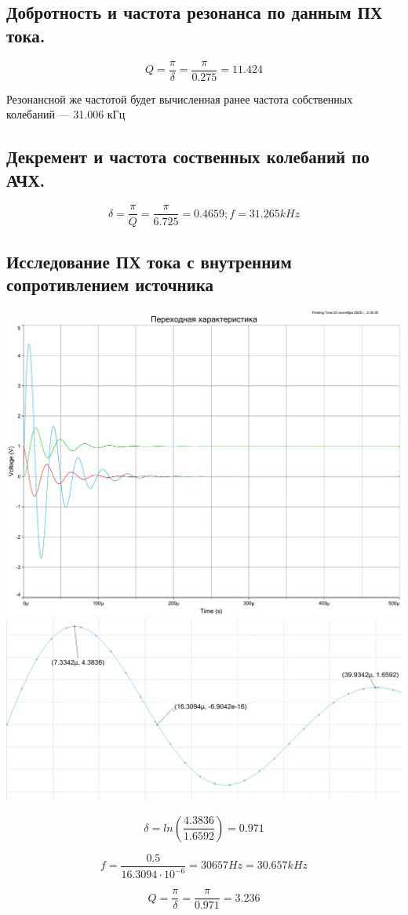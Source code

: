 \documentclass[12pt,a4paper]{article}
\begin{document}
		\subsection{Добротность и частота резонанса по данным ПХ тока.\newline}
			
			\[Q = \frac{\pi}{\delta} = \frac{\pi}{0.275} = 11.424\]
			
			Резонансной же частотой будет вычисленная ранее частота собственных колебаний --- 31.006 кГц
			
		\subsection{Декремент и частота соственных колебаний по АЧХ.\newline}
		
			\[\delta = \frac{\pi}{Q} = \frac{\pi}{6.725} = 0.4659; f = 31.265 kHz\]
			
		\subsection{Исследование ПХ тока с внутренним сопротивлением источника\newline}
		
			\includegraphics[width=0.5\linewidth]{src/TH_20om}
			\includegraphics[width=0.5\linewidth]{src/TH_current_20m}
			
			\[\delta = ln\left(\frac{4.3836}{1.6592}\right) = 0.971\]
			
			\[f = \frac{0.5}{16.3094 \cdot 10^{-6}} = 30657 Hz = 30.657 kHz\]
			
			\[Q = \frac{\pi}{\delta} = \frac{\pi}{0.971} = 3.236\]
			
\end{document}
